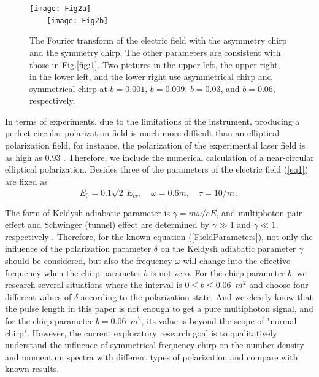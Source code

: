 \documentclass[aps,preprint,superscriptaddress]{revtex4}
\begin{document}
\begin{figure}[ht]%
\begin{center}
\texttt{[image: Fig2a]}\\
~~~~\texttt{[image: Fig2b]}
\end{center}
\vspace{-10mm}
\caption{The Fourier transform of the electric field with the asymmetry chirp and the symmetry chirp. The other parameters are consistent with those in Fig.\ref{fig:1}. Two pictures in the upper left, the upper right, in the lower left, and the lower right use asymmetrical chirp and symmetrical chirp at $b=0.001$, $b=0.009$, $b=0.03$, and $b=0.06$, respectively.}
\label{fig:10}
\end{figure}

In terms of experiments, due to the limitations of the instrument, producing a perfect circular polarization field is much more difficult than an elliptical polarization field, for instance, the polarization of the experimental laser field is as high as $0.93$ \cite{Pfeiffer:2012np}. Therefore, we include the numerical calculation of a near-circular elliptical polarization.
Besides three of the parameters of the electric field (\ref{eq1}) are fixed as
\begin{equation}
E_{0} = 0.1 \sqrt{2}\, E_{cr} , \quad \omega=0.6m , \quad \tau=10/m \, ,
\label{FieldParameters}
\end{equation}


The form of Keldysh adiabatic parameter is $\gamma=m \omega /eE$, and multiphoton pair effect and Schwinger (tunnel) effect are determined by $\gamma \gg 1$ and $\gamma \ll 1$, respectively \cite{Keldysh:1965pj}. Therefore, for the known equation (\ref{FieldParameters}), not only the influence of the polarization parameter $\delta$ on the Keldysh adiabatic parameter $\gamma$ should be considered, but also the frequency $\omega$ will change into the effective frequency when the chirp parameter $b$ is not zero. For the chirp parameter $b$, we research several situations where the interval is $0\le b\le0.06$~$m^2$ and choose four different values of $\delta$ according to the polarization state. And we clearly know that the pulse length in this paper is not enough to get a pure multiphoton signal, and for the chirp parameter $b=0.06 $~$m^2$, its value is beyond the scope of "normal chirp". However, the current exploratory research goal is to qualitatively understand the influence of symmetrical frequency chirp on the number density and momentum spectra with different types of polarization and compare with known results.
\end{document}

